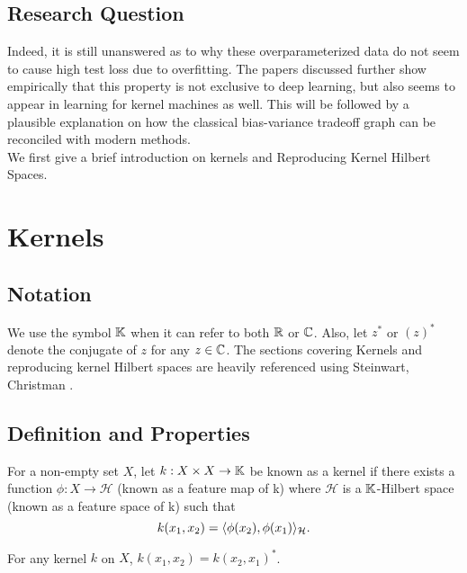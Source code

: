 \documentclass[twoside]{memoir}
\begin{document}
\section{Research Question}

Indeed, it is still unanswered as to why these overparameterized data do not seem to cause high test loss due to overfitting. The papers discussed further show empirically that this property is not exclusive to deep learning, but also seems to appear in learning for kernel machines as well. This will be followed by a plausible explanation on how the classical bias-variance tradeoff graph can be reconciled with modern methods.\\
We first give a brief introduction on kernels and Reproducing Kernel Hilbert Spaces.

\chapter{Kernels}
	\section{Notation}
	We use the symbol $\mathbb{K}$  when it can refer to both $\mathbb{R}$ or $\mathbb{C}$. Also, let $z^*$ or $(z)^*$ denote the conjugate of $z$ for any $z \in \mathbb{C}$.
	The sections covering Kernels and reproducing kernel Hilbert spaces are heavily referenced using Steinwart, Christman \cite{steinwartSVM}.
	
	\section{Definition and Properties}
	\begin{defn}
		For a non-empty set $X$, let $k: X \times X \rightarrow \mathbb{K}$ be known as a kernel if there exists a function $\phi: X \rightarrow \mathcal{H}$ (known as a feature map of k) where $\mathcal{H}$ is a $\mathbb{K}$-Hilbert space (known as a feature space of k) such that
		\begin{equation}
		k(x_1, x_2) = \langle\phi(x_2), \phi(x_1)\rangle_\mathcal{H}.
		\end{equation}
	\end{defn}
	
	\begin{lem} \label{lem:kernelSymm}
		For any kernel $k$ on $X$, $k(x_1, x_2) = k(x_2, x_1)^*$.
	\end{lem}
	
\end{document}
